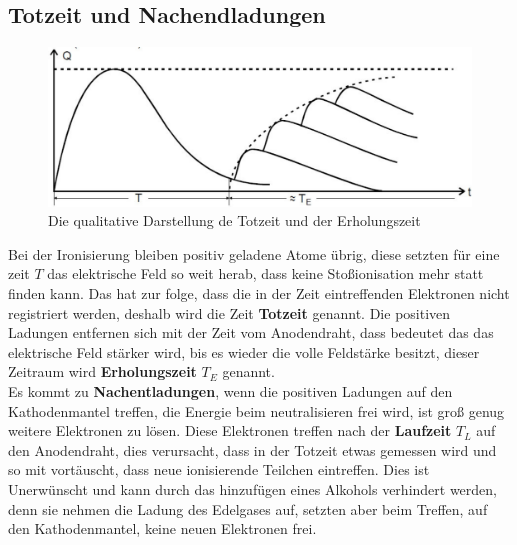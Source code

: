 \subsection{Totzeit und Nachendladungen}
\begin{figure}
\centering
\includegraphics[scale=0.5]{Grafiken/Totzeit.pdf}
\caption{Die qualitative Darstellung de Totzeit und der Erholungszeit \cite{V703}\label{Totzeit}}

\end{figure}
Bei der Ironisierung bleiben positiv geladene Atome übrig, diese setzten für eine zeit $T$ das elektrische Feld so weit herab, dass keine Stoßionisation mehr statt finden kann. Das hat zur folge, dass die in der Zeit eintreffenden Elektronen nicht registriert werden, deshalb wird die Zeit \textbf{Totzeit} genannt. Die positiven Ladungen entfernen sich mit der Zeit vom Anodendraht, dass bedeutet das das elektrische Feld stärker wird, bis es wieder die volle Feldstärke besitzt, dieser Zeitraum wird \textbf{Erholungszeit} $T_E$ genannt.\\
Es kommt zu \textbf{Nachentladungen}, wenn die positiven Ladungen auf den Kathodenmantel treffen, die Energie beim neutralisieren frei wird, ist groß genug weitere Elektronen zu lösen. Diese Elektronen treffen nach der \textbf{Laufzeit} $T_L$ auf den Anodendraht, dies verursacht, dass in der Totzeit etwas gemessen wird und so mit vortäuscht, dass neue ionisierende Teilchen eintreffen. Dies ist Unerwünscht und kann durch das hinzufügen eines Alkohols verhindert werden, denn sie nehmen die Ladung des Edelgases auf, setzten aber beim Treffen, auf den Kathodenmantel, keine neuen Elektronen frei.
